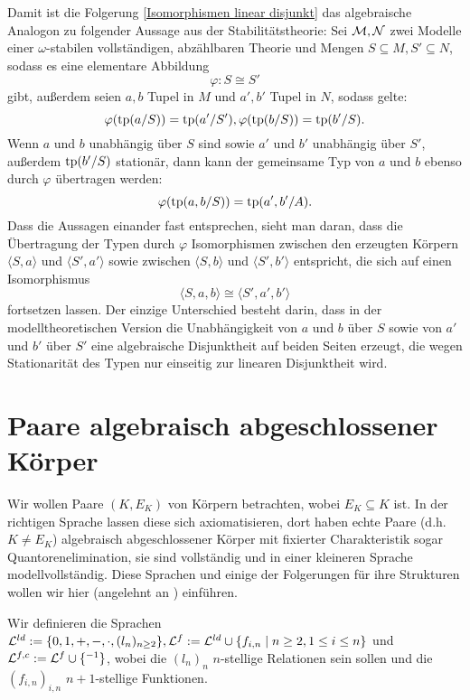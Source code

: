     \begin{remark}
    	Damit ist die Folgerung \ref{Isomorphismen linear disjunkt} das algebraische Analogon zu folgender Aussage aus der Stabilitätstheorie: Sei $\mathcal{M},\mathcal{N}$ zwei Modelle einer $\omega$-stabilen vollständigen, abzählbaren Theorie und Mengen $S\subseteq M,S'\subseteq N$, sodass es eine elementare Abbildung $$\varphi:S\cong S'$$ gibt, außerdem seien $a,b$ Tupel in $M$ und $a',b'$ Tupel in $N$, sodass gelte: $$\varphi(\operatorname{tp}(a/S))=\operatorname{tp}(a'/S'),\varphi(\operatorname{tp}(b/S))=\operatorname{tp}(b'/S).$$
    	Wenn $a$ und $b$ unabhängig über $S$ sind sowie $a'$ und $b'$ unabhängig über $S'$, außerdem $\operatorname{tp}(b'/S)$ stationär, dann kann der gemeinsame Typ von $a$ und $b$ ebenso durch $\varphi$ übertragen werden: $$\varphi(\operatorname{tp}(a,b/S))=\operatorname{tp}(a',b'/A).$$
    	Dass die Aussagen einander fast entsprechen, sieht man daran, dass die Übertragung der Typen durch $\varphi$ Isomorphismen zwischen den erzeugten Körpern $\langle S,a\rangle$ und $\langle S',a'\rangle$ sowie zwischen $\langle S,b\rangle$ und $\langle S',b'\rangle$ entspricht, die sich auf einen Isomorphismus $$\langle S,a,b\rangle\cong\langle S',a',b'\rangle$$ fortsetzen lassen. Der einzige Unterschied besteht darin, dass in der modelltheoretischen Version die Unabhängigkeit von $a$ und $b$ über $S$ sowie von $a'$ und $b'$ über $S'$ eine algebraische Disjunktheit auf beiden Seiten erzeugt, die wegen Stationarität des Typen nur einseitig zur linearen Disjunktheit wird.
    \end{remark}

    \newpage
    \section{Paare algebraisch abgeschlossener Körper}
    Wir wollen Paare $(K,E_K)$ von Körpern betrachten, wobei $E_K\subseteq K$ ist. In der richtigen Sprache lassen diese sich axiomatisieren, dort haben echte Paare (d.h. $K\neq E_K$) algebraisch abgeschlossener Körper mit fixierter Charakteristik sogar Quantoren\-elimination, sie sind vollständig und in einer kleineren Sprache modellvollständig. Diese Sprachen und einige der Folgerungen für ihre Strukturen wollen wir hier (angelehnt an \cite{Delon}) einführen.
    
    \begin{definition}
    	Wir definieren die Sprachen $\mathcal{L}^{ld}:=\{0,1,+,-,\cdot,(l_n)_{n\geq2}\},\mathcal{L}^f:=\mathcal{L}^{ld}\cup\{f_{i,n}\mid n\geq2,1\leq i\leq n\}$ und $\mathcal{L}^{f,c}:=\mathcal{L}^f\cup\{^{-1}\}$, wobei die $(l_n)_n$ $n$-stellige Relationen sein sollen und die $(f_{i,n})_{i,n}$ $n+1$-stellige Funktionen.
    \end{definition}
    
